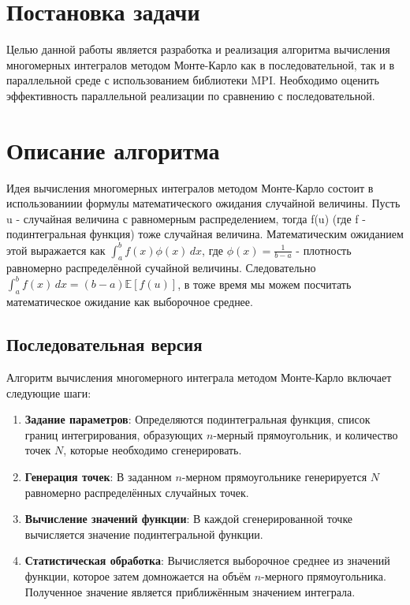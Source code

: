 \documentclass[a4paper,12pt]{article}
\begin{document}
\section{Постановка задачи}

Целью данной работы является разработка и реализация алгоритма вычисления многомерных интегралов методом Монте-Карло как в последовательной, так и в параллельной среде с использованием библиотеки MPI. Необходимо оценить эффективность параллельной реализации по сравнению с последовательной.

\section{Описание алгоритма}

Идея вычисления многомерных интегралов методом Монте-Карло состоит в использованиии формулы математического ожидания случайной величины.
Пусть u - случайная величина с равномерным распределением, тогда f(u) (где f - подинтегральная функция) тоже случайная величина. Математическим ожиданием этой выражается как $\int_a^b f(x) \phi(x) \, dx$, где $\phi(x)=\frac{1}{b-a}$ - плотность равномерно распределённой сучайной величины. Следовательно $\int_a^b f(x)\, dx = (b-a)\mathbb{E}[f(u)]$, в тоже время мы можем посчитать математическое ожидание как выборочное среднее.

\subsection{Последовательная версия}

Алгоритм вычисления многомерного интеграла методом Монте-Карло включает следующие шаги:

\begin{enumerate}
    \item \textbf{Задание параметров}: Определяются подинтегральная функция, список границ интегрирования, образующих $n$-мерный прямоугольник, и количество точек $N$, которые необходимо сгенерировать.
    
    \item \textbf{Генерация точек}: В заданном $n$-мерном прямоугольнике генерируется $N$ равномерно распределённых случайных точек.
    
    \item \textbf{Вычисление значений функции}: В каждой сгенерированной точке вычисляется значение подинтегральной функции.
    
    \item \textbf{Статистическая обработка}: Вычисляется выборочное среднее из значений функции, которое затем домножается на объём $n$-мерного прямоугольника. Полученное значение является приближённым значением интеграла.
\end{enumerate}
\end{document}
